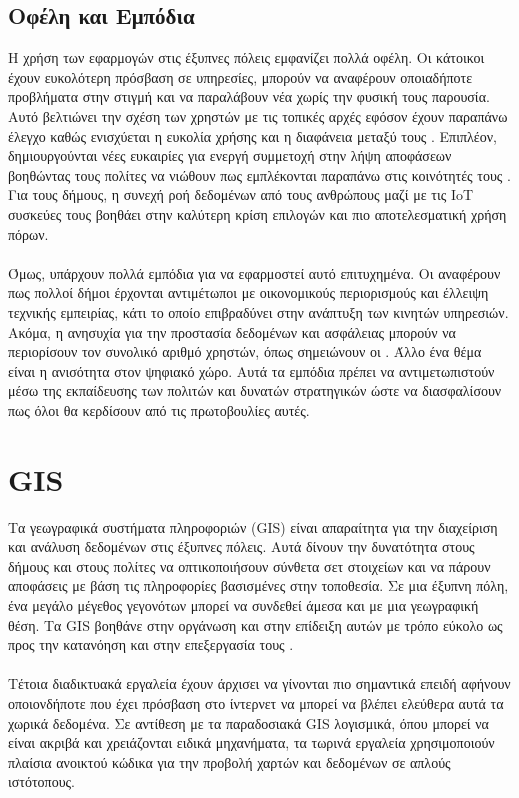 \subsection{Οφέλη και Εμπόδια}
Η χρήση των εφαρμογών στις έξυπνες πόλεις εμφανίζει πολλά οφέλη. Οι κάτοικοι έχουν ευκολότερη πρόσβαση σε υπηρεσίες, μπορούν να αναφέρουν οποιαδήποτε προβλήματα στην στιγμή και να παραλάβουν νέα χωρίς την φυσική τους παρουσία. Αυτό βελτιώνει την σχέση των χρηστών με τις τοπικές αρχές εφόσον έχουν παραπάνω έλεγχο καθώς ενισχύεται η ευκολία χρήσης και η διαφάνεια μεταξύ τους \parencite{hou2020road}. Επιπλέον, δημιουργούνται νέες ευκαιρίες για ενεργή συμμετοχή στην λήψη αποφάσεων βοηθώντας τους πολίτες να νιώθουν πως εμπλέκονται παραπάνω στις κοινότητές τους \parencite{boulos2015social}. Για τους δήμους, η συνεχή ροή δεδομένων από τους ανθρώπους μαζί με τις IoT συσκεύες τους βοηθάει στην καλύτερη κρίση επιλογών και πιο αποτελεσματική χρήση πόρων.
\\
\\
Όμως, υπάρχουν πολλά εμπόδια για να εφαρμοστεί αυτό επιτυχημένα. Οι \textcite{siokas2019} αναφέρουν πως πολλοί δήμοι έρχονται αντιμέτωποι με οικονομικούς περιορισμούς και έλλειψη τεχνικής εμπειρίας, κάτι το οποίο επιβραδύνει στην ανάπτυξη των κινητών υπηρεσιών. Ακόμα, η ανησυχία για την προστασία δεδομένων και ασφάλειας μπορούν να περιορίσουν τον συνολικό αριθμό χρηστών, όπως σημειώνουν οι \textcite{angelopoulos2019}. Άλλο ένα θέμα είναι η ανισότητα στον ψηφιακό χώρο. Αυτά τα εμπόδια πρέπει να αντιμετωπιστούν μέσω της εκπαίδευσης των πολιτών και δυνατών στρατηγικών ώστε να διασφαλίσουν πως όλοι θα κερδίσουν από τις πρωτοβουλίες αυτές.
\\
\section{GIS}
Τα γεωγραφικά συστήματα πληροφοριών (GIS) είναι απαραίτητα για την διαχείριση και ανάλυση δεδομένων στις έξυπνες πόλεις. Αυτά δίνουν την δυνατότητα στους δήμους και στους πολίτες να οπτικοποιήσουν σύνθετα σετ στοιχείων και να πάρουν αποφάσεις με βάση τις πληροφορίες βασισμένες στην τοποθεσία. Σε μια έξυπνη πόλη, ένα μεγάλο μέγεθος γεγονότων μπορεί να συνδεθεί άμεσα και με μια γεωγραφική θέση. Τα GIS βοηθάνε στην οργάνωση και στην επίδειξη αυτών με τρόπο εύκολο ως προς την κατανόηση και στην επεξεργασία τους \parencite{zhaoexploring}. 
\\
\\
Τέτοια διαδικτυακά εργαλεία έχουν άρχισει να γίνονται πιο σημαντικά επειδή αφήνουν οποιονδήποτε που έχει πρόσβαση στο ίντερνετ να μπορεί να βλέπει ελεύθερα αυτά τα χωρικά δεδομένα. Σε αντίθεση με τα παραδοσιακά GIS λογισμικά, όπου μπορεί να είναι ακριβά και χρειάζονται ειδικά μηχανήματα, τα τωρινά εργαλεία χρησιμοποιούν πλαίσια ανοικτού κώδικα για την προβολή χαρτών και δεδομένων σε απλούς ιστότοπους.

